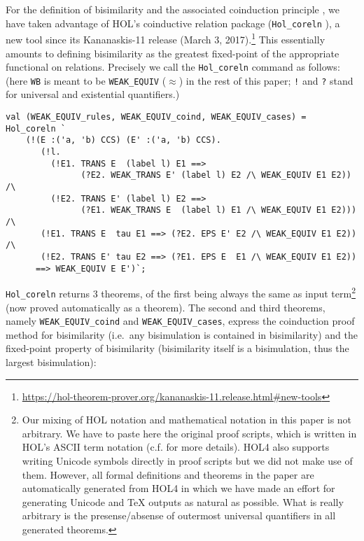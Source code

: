 For the definition of bisimilarity and the associated coinduction
principle \cite{sangiorgi2011advanced}, we have taken
advantage of HOL's coinductive relation package (\texttt{Hol_coreln} \cite{holdesc}),
a new tool since its Kananaskis-11 release (March 3,
2017).\footnote{\url{https://hol-theorem-prover.org/kananaskis-11.release.html\#new-tools}}
This essentially amounts to defining bisimilarity as the greatest
fixed-point of the appropriate functional on relations. 
Precisely we call 
the \texttt{Hol_coreln}
command as follows: (here \texttt{WB} is meant to be
\texttt{WEAK_EQUIV} ($\approx$) in the rest of this paper;
{\tt !} and {\tt ?} stand for universal and
existential quantifiers.)
\begin{lstlisting}
val (WEAK_EQUIV_rules, WEAK_EQUIV_coind, WEAK_EQUIV_cases) = Hol_coreln `
    (!(E :('a, 'b) CCS) (E' :('a, 'b) CCS).
       (!l.
         (!E1. TRANS E  (label l) E1 ==>
               (?E2. WEAK_TRANS E' (label l) E2 /\ WEAK_EQUIV E1 E2)) /\
         (!E2. TRANS E' (label l) E2 ==>
               (?E1. WEAK_TRANS E  (label l) E1 /\ WEAK_EQUIV E1 E2))) /\
       (!E1. TRANS E  tau E1 ==> (?E2. EPS E' E2 /\ WEAK_EQUIV E1 E2)) /\
       (!E2. TRANS E' tau E2 ==> (?E1. EPS E  E1 /\ WEAK_EQUIV E1 E2))
      ==> WEAK_EQUIV E E')`;
\end{lstlisting}
\texttt{Hol_coreln} returns 3 theorems, of the first being always the
same as input term\footnote{Our mixing of HOL notation and mathematical
  notation in this paper is not arbitrary. We have to paste here the
  original proof scripts, which is written in HOL's ASCII term
  notation (c.f. \cite{holdesc} for more details). HOL4 also supports writing Unicode symbols directly in
  proof scripts but we did not make use of them. However, all formal definitions and
  theorems in the paper are automatically generated from HOL4 in
  which we have made an effort for generating
  Unicode and TeX outputs as natural as possible. What is really
  arbitrary is the presense/absense of outermost universal
  quantifiers in all generated theorems.} (now proved automatically as a theorem).
The second and third theorems, namely \texttt{WEAK_EQUIV_coind} and \texttt{WEAK_EQUIV_cases},
express the coinduction proof method for bisimilarity 
(i.e.~any bisimulation is contained in bisimilarity)
and the fixed-point property of bisimilarity
(bisimilarity itself is a bisimulation, thus the largest
bisimulation):
